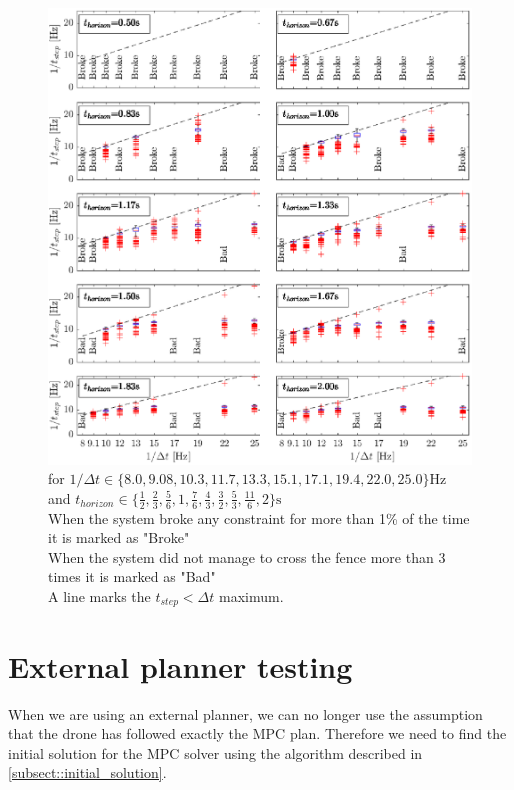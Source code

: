 \begin{figure}
	\centering
	\begin{center}
		\includegraphics[width=1\linewidth]{Figures/time_horizon}
		\caption[Graph of $1/t_{step}$]{ for $1/\Delta t\in\{8.0, 9.08, 10.3, 11.7, 13.3, 15.1, 17.1, 19.4, 22.0, 25.0\} \si{\hertz}$ and $t_{horizon}\in\{\frac{1}{2} , \frac{2}{3} , \frac{5}{6} , 1 , \frac{7}{6} , \frac{4}{3} , \frac{3}{2} , \frac{5}{3} , \frac{11}{6} , 2 \} \si{\second}$ \\ When the system broke any constraint for more than 1\% of the time it is marked as "Broke" \\When the system did not manage to cross the fence more than 3 times it is marked as "Bad" \\ A line marks the $t_{step}<\Delta t$ maximum.}
		\label{fig::time_horizon}
	\end{center}
\end{figure}

\section{External planner testing}
When we are using an external planner, we can no longer use the assumption that the drone has followed exactly the \ac{MPC} plan. Therefore we need to find the initial solution for the \ac{MPC} solver using the algorithm described in \cref{subsect::initial_solution}.

